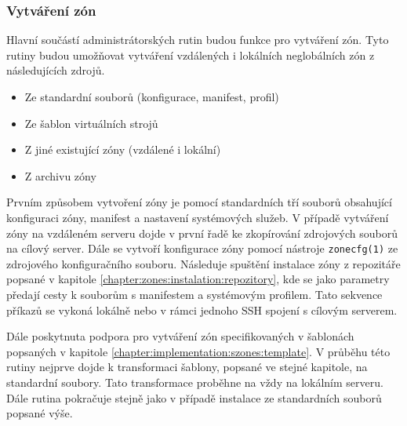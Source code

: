 \subsubsection{Vytváření zón}
\label{chapter:implementation:szones:routines:creation}
Hlavní součástí administrátorských rutin budou funkce pro vytváření zón. Tyto rutiny budou umožňovat vytváření vzdálených i
lokálních neglobálních zón z následujících zdrojů.
\begin{itemize}
 \item Ze standardní souborů (konfigurace, manifest, profil)
 \item Ze šablon virtuálních strojů
 \item Z jiné existující zóny (vzdálené i lokální)
 \item Z archivu zóny
\end{itemize}

Prvním způsobem vytvoření zóny je pomocí standardních tří souborů obsahující konfiguraci zóny, manifest a nastavení systémových
služeb. V případě vytváření zóny na vzdáleném serveru dojde v první řadě ke zkopírování zdrojových souborů na cílový server.
Dále se vytvoří konfigurace zóny pomocí nástroje \verb|zonecfg(1)| ze zdrojového konfiguračního souboru. Následuje spuštění
instalace zóny z repozitáře popsané v kapitole \ref{chapter:zones:instalation:repozitory}, kde se jako parametry předají
cesty k souborům s manifestem a systémovým profilem. Tato sekvence příkazů se vykoná lokálně nebo v rámci jednoho SSH spojení
s cílovým serverem.

Dále poskytnuta podpora pro vytváření zón specifikovaných v šablonách popsaných v kapitole \ref{chapter:implementation:szones:template}. 
V průběhu této rutiny nejprve dojde k transformaci šablony, popsané ve stejné kapitole, na standardní soubory. Tato transformace proběhne na 
vždy na lokálním serveru. Dále rutina pokračuje stejně jako v případě instalace ze standardních souborů popsané výše.

